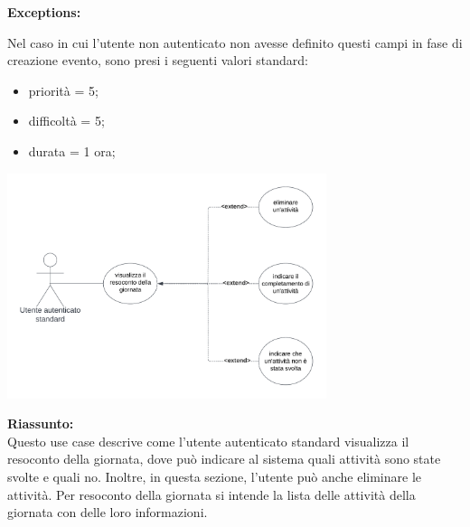 \begin{listaPersonale}[UC]{}
\begin{listaPersonale2} [UC] {}
    \textbf{Exceptions:}
    \begin{enumerate}[label=\textbf{[exception \arabic{enumiii}]}, ref= \textbf{[exception \arabic{enumiii}]}]
         Nel caso in cui l'utente non autenticato non avesse definito questi campi in fase di creazione evento, sono presi i seguenti valori standard:
        \begin{itemize}
            \item priorità = 5;
            \item difficoltà = 5;
            \item durata = 1 ora;
        \end{itemize}
    \end{enumerate}
    \end{listaPersonale2}





    \newpage


    \begin{center}
        \includegraphics[width=0.7\textwidth]{img/Diagrammi/UseCases/ResocontoGiornata.png}
    \end{center}

    \textbf{Riassunto:} \\
    Questo use case descrive come l'utente autenticato standard visualizza il resoconto della giornata, dove può indicare al sistema quali attività sono state svolte e quali no. Inoltre, in questa sezione, l'utente può anche eliminare le attività. Per resoconto della giornata si intende la lista delle attività della giornata con delle loro informazioni.


\end{listaPersonale}
